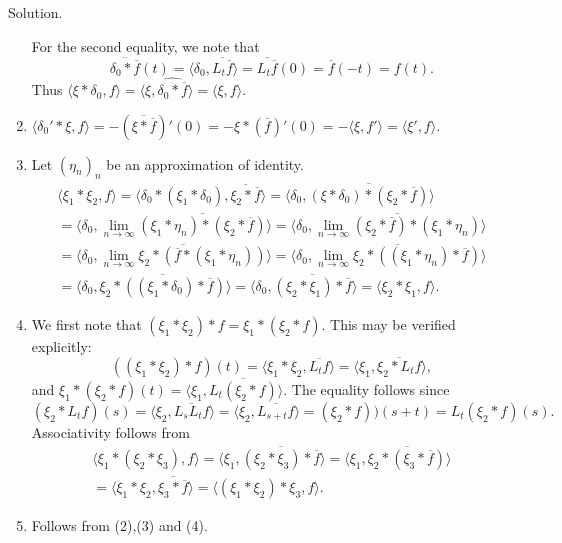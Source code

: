 \documentclass[12pt, draft,reqno,a4paper, twoside]{amsproc}
\newcommand{\gen}[1]{\langle{#1}\rangle}
\newcommand{\widebar}{\overline}
\newenvironment{sol}{\sc Solution. \rm}{\hfill \qedsymbol\bigskip}
\begin{document}
\begin{sol}
\begin{enumerate}
For the second equality, we note that \[\widebar{\delta_0\ast \widebar{f}}(t)=\gen{\delta_0,\widebar{L_{t}\widebar{f}}}=\widebar{L_t\widebar{f}}(0)=\widebar{f}(-t)=f(t).\] Thus
$\gen{\xi\ast \delta_0,f}=\gen{\xi, \widehat{\delta_0\ast\widebar{f}}}=\gen{\xi,f}.$
\item $\gen{\delta_0'\ast\xi,f}=-(\widebar{\xi\ast\widebar{f}})'(0)=-\xi\ast(\widebar{f})'(0)=-\gen{\xi,f'}=\gen{\xi',f}$.
\item Let $(\eta_n)_n$ be an approximation of identity.
\begin{multline*}
\gen{\xi_1\ast\xi_2,f}=\gen{\delta_0\ast(\xi_1\ast \delta_0), \widebar{\xi_2\ast \widebar{f}}}=\gen{\delta_0,\widebar{(\xi\ast\delta_0)\ast(\xi_2\ast\widebar{f})}}\\=\gen{\delta_0,\lim_{n\to\infty}\widebar{(\xi_1\ast\eta_n)\ast(\xi_2\ast\widebar{f})}}=\gen{\delta_0,\widebar{\lim_{n\to\infty}(\xi_2\ast\widebar{f})\ast(\xi_1\ast \eta_n)}}\\=\gen{\delta_0,\widebar{\lim_{n\to\infty}\xi_2\ast(\widebar{f}\ast(\xi_1\ast \eta_n))}}=\gen{\delta_0,\widebar{\lim_{n\to\infty}\xi_2\ast((\xi_1\ast \eta_n)\ast \widebar{f})}}\\=\gen{\delta_0,\widebar{\xi_2\ast((\xi_1\ast \delta_0)\ast \widebar{f})}}=\gen{\delta_0,\widebar{(\xi_2\ast\xi_1)\ast\widebar{f}}}=\gen{\xi_2\ast\xi_1,f}.
\end{multline*}
\item We first note that $(\xi_1\ast\xi_2)\ast f=\xi_1\ast(\xi_2 \ast f)$. This may be verified explicitly:
\[((\xi_1\ast\xi_2)\ast f)(t)=\gen{\xi_1\ast\xi_2,\widebar{L_t f}}=\gen{\xi_1,\widebar{\xi_2\ast L_t f}},\]
and $\xi_1\ast(\xi_2\ast f)(t)=\gen{\xi_1,\widebar{L_t(\xi_2\ast f)}}.$ The equality follows since
\[(\xi_2\ast L_t f)(s)=\gen{\xi_2,\widebar{L_sL_t f}}=\gen{\xi_2,\widebar{L_{s+t}f}}=(\xi_2\ast f))(s+t)=L_t(\xi_2\ast f)(s).\]
Associativity follows from 
\begin{multline*}
\gen{\xi_1\ast(\xi_2\ast\xi_3),f}=\gen{\xi_1,\widebar{(\xi_2\ast\xi_3)\ast \widebar{f}}}=\gen{\xi_1,\widebar{\xi_2\ast (\xi_3\ast \widebar{f})}}\\
=\gen{\xi_1\ast\xi_2,\widebar{\xi_3\ast\widebar{f}}}=\gen{(\xi_1\ast\xi_2)\ast\xi_3,f}.
\end{multline*}
\item Follows from (2),(3) and (4).
\end{enumerate}
\end{sol}
\end{document}
